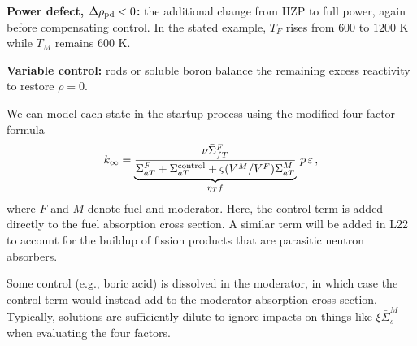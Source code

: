 \documentclass[compact]{ne630handout}
\begin{document}
\vspace{5pt}

\textbf{Power defect, $\Delta\rho_{\rm pd}<0$:} the additional change from HZP to full power, again before compensating control. In the stated example, $T_F$ rises from $600$ to $1200$ K while $T_M$ remains $600$ K.

\vspace{5pt}

\textbf{Variable control:} rods or soluble boron balance the remaining excess reactivity to restore $\rho=0$.


We can model each state in the startup process using the modified
four-factor formula
$$
 k_\infty=
 \underbrace{\frac{\nu\bar\Sigma^{F}_{fT}}
 {\bar\Sigma^{F}_{aT}+\bar\Sigma^{\rm control}_{a T}
 +\varsigma(V^M/V^F)\bar\Sigma^{M}_{a T}}}_{\eta_T f}
 \,p\,\varepsilon \, ,
$$
where $F$ and $M$ denote fuel and moderator. Here, the control term is added directly to the fuel absorption cross section.  A similar term will be added in L22 to account for the buildup of fission products that are parasitic neutron absorbers.

\vspace{5pt}

Some control (e.g., boric acid) is dissolved in the moderator, in which case the control term would instead add to the moderator absorption cross section.  Typically, solutions are sufficiently dilute to ignore impacts on things like $\xi \bar\Sigma_{s}^M$ when evaluating the four factors.

\colend
\end{document}
